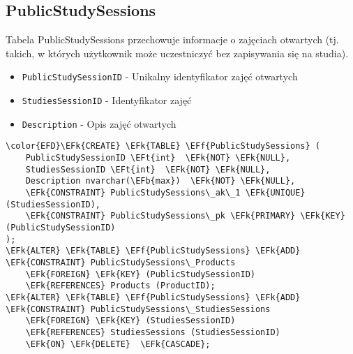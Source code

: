 \documentclass[11pt]{article}
\newcommand{\EFk}[1]{\textcolor{EFk}{\textbf{#1}}} %
\newcommand{\EFb}[1]{\textcolor{EFb}{\textbf{#1}}} %
\newcommand{\EFf}[1]{\textcolor{EFf}{#1}} %
\newcommand{\EFt}[1]{\textcolor{EFt}{\textbf{#1}}} %
\begin{document}
\subsection{PublicStudySessions}
\label{sec:org1ba3b83}
Tabela PublicStudySessions przechowuje informacje o zajęciach otwartych  (tj. takich, w których użytkownik może uczestniczyć bez zapisywania się na studia).
\begin{itemize}
\item \texttt{PublicStudySessionID} - Unikalny identyfikator zajęć otwartych
\item \texttt{StudiesSessionID} - Identyfikator zajęć
\item \texttt{Description} - Opis zajęć otwartych
\end{itemize}
\begin{Code}
\begin{Verbatim}
\color{EFD}\EFk{CREATE} \EFk{TABLE} \EFf{PublicStudySessions} (
    PublicStudySessionID \EFt{int}  \EFk{NOT} \EFk{NULL},
    StudiesSessionID \EFt{int}  \EFk{NOT} \EFk{NULL},
    Description nvarchar(\EFb{max})  \EFk{NOT} \EFk{NULL},
    \EFk{CONSTRAINT} PublicStudySessions\_ak\_1 \EFk{UNIQUE} (StudiesSessionID),
    \EFk{CONSTRAINT} PublicStudySessions\_pk \EFk{PRIMARY} \EFk{KEY}  (PublicStudySessionID)
);
\EFk{ALTER} \EFk{TABLE} \EFf{PublicStudySessions} \EFk{ADD} \EFk{CONSTRAINT} PublicStudySessions\_Products
    \EFk{FOREIGN} \EFk{KEY} (PublicStudySessionID)
    \EFk{REFERENCES} Products (ProductID);
\EFk{ALTER} \EFk{TABLE} \EFf{PublicStudySessions} \EFk{ADD} \EFk{CONSTRAINT} PublicStudySessions\_StudiesSessions
    \EFk{FOREIGN} \EFk{KEY} (StudiesSessionID)
    \EFk{REFERENCES} StudiesSessions (StudiesSessionID)
    \EFk{ON} \EFk{DELETE}  \EFk{CASCADE};
\end{Verbatim}
\end{Code}
\end{document}
